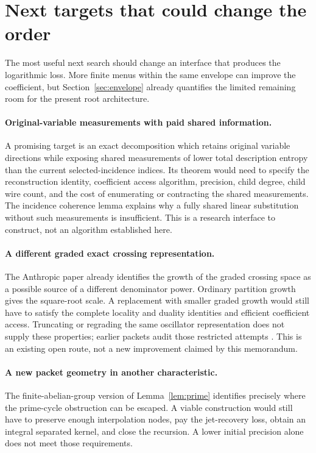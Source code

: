 \section{Next targets that could change the order}

The most useful next search should change an interface that produces the
logarithmic loss. More finite menus within the same envelope can improve
the coefficient, but Section~\ref{sec:envelope} already quantifies the
limited remaining room for the present root architecture.

\paragraph{Original-variable measurements with paid shared information.}
A promising target is an exact decomposition which retains original
variable directions while exposing shared measurements of lower total
description entropy than the current selected-incidence indices.
Its theorem would need to specify the reconstruction identity, coefficient
access algorithm, precision, child degree, child wire count, and the cost
of enumerating or contracting the shared measurements. The incidence
coherence lemma explains why a fully shared linear substitution without
such measurements is insufficient. This is a research interface to
construct, not an algorithm established here.

\paragraph{A different graded exact crossing representation.}
The Anthropic paper already identifies the growth of the graded crossing
space as a possible source of a different denominator power. Ordinary
partition growth gives the square-root scale. A replacement with smaller
graded growth would still have to satisfy the complete locality and
duality identities and efficient coefficient access. Truncating or
regrading the same oscillator representation does not supply these
properties; earlier packets audit those restricted attempts
\cite{anthropic-paper,alternate}. This is an existing open route, not a
new improvement claimed by this memorandum.

\paragraph{A new packet geometry in another characteristic.}
The finite-abelian-group version of Lemma~\ref{lem:prime} identifies
precisely where the prime-cycle obstruction can be escaped. A viable
construction would still have to preserve enough interpolation nodes,
pay the jet-recovery loss, obtain an integral separated kernel, and close
the recursion. A lower initial precision alone does not meet those
requirements.


